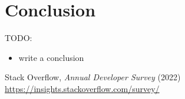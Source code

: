 \documentclass[licencjacka,en]{pracamgr}
\begin{document}
\chapter{Conclusion}\label{r:chapter_conclusion}

TODO:
\begin{itemize}
	\item write a conclusion
\end{itemize}



\appendix

\begin{thebibliography}{99}







 Stack Overflow,
	\textit{Annual Developer Survey} (2022) \\
	\url{https://insights.stackoverflow.com/survey/}









\end{thebibliography}
\end{document}
